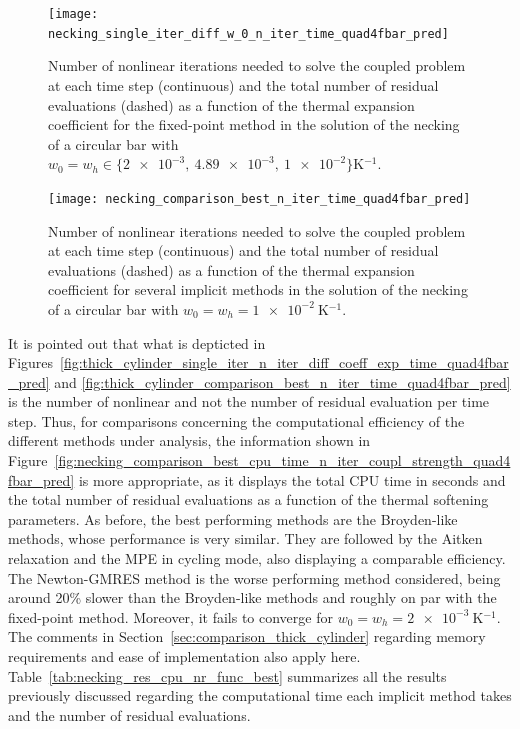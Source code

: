      \begin{figure}[htbp]
       \centering
       \texttt{[image: necking\_single\_iter\_diff\_w\_0\_n\_iter\_time\_quad4fbar\_pred]}
       \caption{Number of nonlinear iterations needed to solve the coupled problem at each time step (continuous) and the total number of residual evaluations (dashed) as a function of the thermal expansion coefficient for the fixed-point method in the solution of the necking of a circular bar with \(w_0=w_h\in\{\num{2e-3},\ \num{4.89e-3},\ \num{1e-2}\}\si{\kelvin^{-1}}\).}
       \label{fig:necking_single_iter_diff_w_0_n_iter_time_quad4fbar_pred}
     \end{figure}

     \begin{figure}[!hbtp]
       \centering
       \texttt{[image: necking\_comparison\_best\_n\_iter\_time\_quad4fbar\_pred]}
       \caption{Number of nonlinear iterations needed to solve the coupled problem at each time step (continuous) and the total number of residual evaluations (dashed) as a function of the thermal expansion coefficient for several implicit methods in the solution of the necking of a circular bar with \(w_0=w_h=\SI{1e-2}{\kelvin^{-1}}\).}
       \label{fig:necking_comparison_best_n_iter_time_quad4fbar_pred}
     \end{figure}


     It is pointed out that what is depticted in Figures~\ref{fig:thick_cylinder_single_iter_n_iter_diff_coeff_exp_time_quad4fbar_pred} and \ref{fig:thick_cylinder_comparison_best_n_iter_time_quad4fbar_pred} is the number of nonlinear and not the number of residual evaluation per time step.
     Thus, for comparisons concerning the computational efficiency of the different methods under analysis, the information shown in
     Figure~\ref{fig:necking_comparison_best_cpu_time_n_iter_coupl_strength_quad4fbar_pred} is more appropriate, as it displays the total CPU time in seconds and the total number of residual evaluations as a function of the thermal softening parameters.
     As before, the best performing methods are the Broyden-like methods, whose performance is very similar.
     They are followed by the Aitken relaxation and the MPE in cycling mode, also displaying a comparable efficiency.
     The Newton-GMRES method is the worse performing method considered, being around 20\% slower than the Broyden-like methods and roughly on par with the fixed-point method.
     Moreover, it fails to converge for \(w_0=w_h=\SI{2e-3}{\kelvin^{-1}}\).
     The comments in Section~\ref{sec:comparison_thick_cylinder} regarding memory requirements and ease of implementation also apply here.
     Table~\ref{tab:necking_res_cpu_nr_func_best} summarizes all the results previously discussed regarding the computational time each implicit method takes and the number of residual evaluations.

